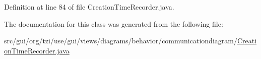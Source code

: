 Definition at line 84 of file Creation\-Time\-Recorder.\-java.



The documentation for this class was generated from the following file\-:\begin{DoxyCompactItemize}
\item 
src/gui/org/tzi/use/gui/views/diagrams/behavior/communicationdiagram/\hyperlink{_creation_time_recorder_8java}{Creation\-Time\-Recorder.\-java}\end{DoxyCompactItemize}
